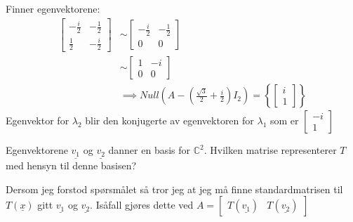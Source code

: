 \documentclass[11pt, a4paper, norsk]{NTNUoving}
\begin{document}
\begin{oppgave}
\begin{punkt}
            Finner egenvektorene:
            \begin{align*}
                \begin{bmatrix}
                    -\frac{i}{2} & -\frac{1}{2} \\
                    \frac{1}{2} & -\frac{i}{2}
                \end{bmatrix} &\sim \begin{bmatrix}
                -\frac{i}{2} & -\frac{1}{2} \\
                0 & 0
                \end{bmatrix}
                \\
                &\sim \begin{bmatrix}
                    1 & -i \\
                    0 & 0
                \end{bmatrix}
                \\
                &\implies Null(A - (\frac{\sqrt{3}}{2} + \frac{i}{2})I_2) = \left\{\begin{bmatrix}
                    i \\
                    1
                \end{bmatrix}\right\}
            \end{align*}
            Egenvektor for $\lambda_2$ blir den konjugerte av egenvektoren for $\lambda_1$ som er $\begin{bmatrix}
                -i \\
                1
            \end{bmatrix}$
        \end{punkt}
        \begin{punkt}
            Egenvektorene $\underline{v_1}$ og $\underline{v_2}$ danner en basis for $\mathbb{C}^{2}$. Hvilken matrise representerer $T$ med hensyn til denne basisen?

            Dersom jeg forstod spørsmålet så tror jeg at jeg må finne standardmatrisen til $T(\underline{x})$ gitt $\underline{v_1}$ og $\underline{v_2}$. Isåfall gjøres dette ved $A = \begin{bmatrix}
                T(\underline{v_1}) & T(\underline{v_2})
            \end{bmatrix}$


\end{punkt}
\end{oppgave}
\end{document}
